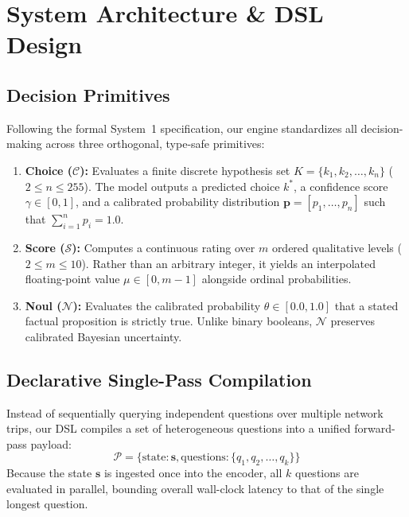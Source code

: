 \documentclass[10pt,twocolumn,letterpaper]{article}
\begin{document}
\section{System Architecture \& DSL Design}

\subsection{Decision Primitives}
Following the formal System~1 specification, our engine standardizes all decision-making across three orthogonal, type-safe primitives:

\begin{enumerate}
    \item \textbf{Choice ($\mathcal{C}$):} Evaluates a finite discrete hypothesis set $K = \{k_1, k_2, \dots, k_n\}$ ($2 \le n \le 255$). The model outputs a predicted choice $k^*$, a confidence score $\gamma \in [0, 1]$, and a calibrated probability distribution $\mathbf{p} = [p_1, \dots, p_n]$ such that $\sum_{i=1}^n p_i = 1.0$.
    \item \textbf{Score ($\mathcal{S}$):} Computes a continuous rating over $m$ ordered qualitative levels ($2 \le m \le 10$). Rather than an arbitrary integer, it yields an interpolated floating-point value $\mu \in [0, m-1]$ alongside ordinal probabilities.
    \item \textbf{Noul ($\mathcal{N}$):} Evaluates the calibrated probability $\theta \in [0.0, 1.0]$ that a stated factual proposition is strictly true. Unlike binary booleans, $\mathcal{N}$ preserves calibrated Bayesian uncertainty.
\end{enumerate}

\subsection{Declarative Single-Pass Compilation}
Instead of sequentially querying independent questions over multiple network trips, our DSL compiles a set of heterogeneous questions into a unified forward-pass payload:
\begin{equation}
\mathcal{P} = \{\text{state}: \mathbf{s}, \text{questions}: \{q_1, q_2, \dots, q_k\}\}
\end{equation}
Because the state $\mathbf{s}$ is ingested once into the encoder, all $k$ questions are evaluated in parallel, bounding overall wall-clock latency to that of the single longest question.
\end{document}
